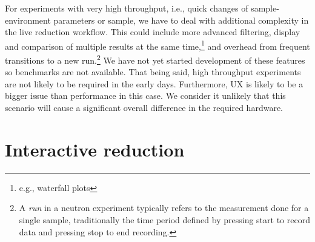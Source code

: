 \documentclass[a4paper,english,numbers=noenddot,bibliography=totoc,chapterprefix=on,DIV=12]{scrartcl}
\begin{document}
For experiments with very high throughput, i.e., quick changes of sample-environment parameters or sample, we have to deal with additional complexity in the live reduction workflow.
This could include more advanced filtering, display and comparison of multiple results at the same time,\footnote{e.g., waterfall plots} and overhead from frequent transitions to a new run.\footnote{A \emph{run} in a neutron experiment typically refers to the measurement done for a single sample, traditionally the time period defined by pressing start to record data and pressing stop to end recording.}
We have not yet started development of these features so benchmarks are not available.
That being said, high throughput experiments are not likely to be required in the early days.
Furthermore, UX is likely to be a bigger issue than performance in this case.
We consider it unlikely that this scenario will cause a significant overall difference in the required hardware.




\section{Interactive reduction}
\end{document}
